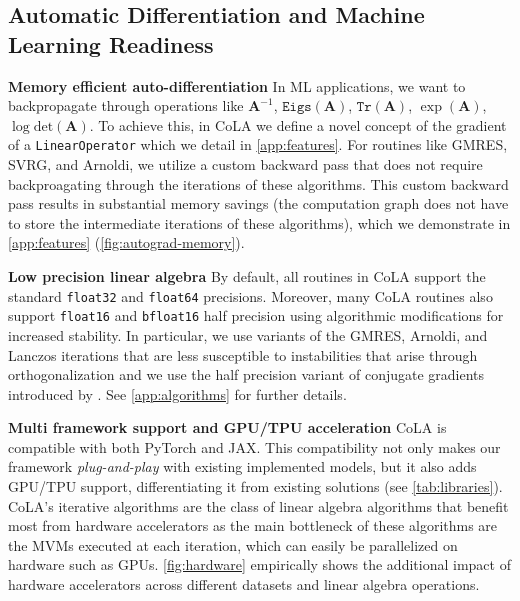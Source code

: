 \documentclass{article}
\newcommand{\mbf}[1]{{\boldsymbol{\mathbf{#1}}}}
\renewcommand{\bm}{\mbf}
\begin{document}
\subsection{Automatic Differentiation and Machine Learning Readiness}\label{subsec:mlready}
\textbf{Memory efficient auto-differentiation} \quad
In ML applications, we want to backpropagate through operations like
$\bm A^{-1}$, $\texttt{Eigs}(\bm A)$, $\texttt{Tr}(\bm A)$, $\exp(\bm A)$, $\log \mathrm{det}(\bm A)$.
To achieve this, in CoLA we define a novel concept of the gradient of a \texttt{LinearOperator}
which we detail in \autoref{app:features}.
For routines like GMRES, SVRG, and Arnoldi,
we utilize a custom backward pass that does not require backproagating through the iterations of these algorithms.
This custom backward pass results in substantial memory savings (the computation graph does not have to store the intermediate iterations of these algorithms), which we demonstrate in \autoref{app:features} (\autoref{fig:autograd-memory}).

\textbf{Low precision linear algebra} \quad
By default, all routines in CoLA support the standard \texttt{float32} and \texttt{float64} precisions.
Moreover, many CoLA routines also support \texttt{float16} and \texttt{bfloat16} half precision
using algorithmic modifications for increased stability.
In particular, we use variants of the GMRES, Arnoldi, and Lanczos iterations that are less susceptible to instabilities that arise through orthogonalization \citep[][Ch.~6]{saad2003iterative}
and we use the half precision variant of conjugate gradients introduced by \citet{maddox2022lowpres}.
See \autoref{app:algorithms} for further details.

\textbf{Multi framework support and GPU/TPU acceleration} \quad
CoLA is compatible with both PyTorch and JAX.
This compatibility not only makes our framework \emph{plug-and-play} with existing implemented models,
but it also adds GPU/TPU support, differentiating it from existing solutions (see \autoref{tab:libraries}).
CoLA's iterative algorithms are the class of linear algebra algorithms that benefit most from hardware accelerators as the main bottleneck of these algorithms are the MVMs executed at each iteration, which can easily be parallelized on hardware such as GPUs.
\autoref{fig:hardware} empirically shows the additional impact of hardware accelerators across different datasets and linear algebra operations.
\end{document}
